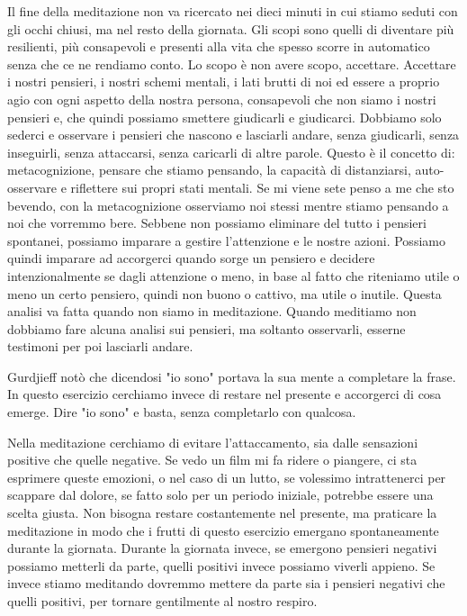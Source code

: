 \documentclass[12pt]{book} %
\begin{document}
Il fine della meditazione non va ricercato nei dieci minuti in cui stiamo seduti con gli occhi chiusi, ma nel resto della giornata. Gli scopi sono quelli di diventare più
resilienti, più consapevoli e presenti alla vita che spesso scorre in automatico senza che ce ne rendiamo conto. Lo scopo è non avere scopo, accettare. Accettare i nostri pensieri, i nostri
schemi mentali, i lati brutti di noi ed essere a proprio agio con ogni aspetto della nostra persona, consapevoli che
non siamo i nostri pensieri e, che quindi possiamo smettere giudicarli e giudicarci.
Dobbiamo solo sederci e osservare i pensieri che nascono e lasciarli andare, senza giudicarli, senza inseguirli, senza attaccarsi, senza caricarli di altre parole.
Questo è il concetto di: metacognizione, pensare che stiamo pensando, la capacità di distanziarsi, auto-osservare e riflettere sui propri
stati mentali. Se mi viene sete penso a me che sto bevendo, con la metacognizione osserviamo
noi stessi mentre stiamo pensando a noi che vorremmo bere. Sebbene non possiamo eliminare del tutto i pensieri spontanei, possiamo imparare a gestire l’attenzione e le nostre azioni. Possiamo quindi imparare ad accorgerci quando sorge un pensiero e decidere
intenzionalmente se dagli attenzione o meno, in base al fatto che riteniamo utile o meno un certo pensiero, quindi non
buono o cattivo, ma utile o inutile. Questa analisi va fatta quando non siamo in meditazione. Quando meditiamo non
dobbiamo fare alcuna analisi sui pensieri, ma soltanto osservarli, esserne testimoni per poi lasciarli andare.

Gurdjieff notò che dicendosi "io sono" portava la sua mente a completare la frase. In questo esercizio cerchiamo invece di restare nel presente e accorgerci di cosa emerge. Dire "io sono" e basta, senza completarlo con qualcosa.

Nella meditazione cerchiamo di evitare l'attaccamento, sia dalle sensazioni positive che quelle negative. Se vedo un film mi fa ridere o piangere, ci sta esprimere queste emozioni, o nel caso di un lutto, se volessimo intrattenerci per scappare dal dolore, se fatto solo per un periodo iniziale, potrebbe essere una scelta giusta.
Non bisogna restare costantemente nel presente, ma praticare la meditazione in modo che i frutti di questo esercizio emergano spontaneamente durante la giornata. Durante la giornata invece, se emergono pensieri negativi possiamo metterli da parte, quelli positivi invece possiamo viverli appieno. Se invece stiamo meditando dovremmo mettere da parte sia i pensieri negativi che quelli positivi, per tornare gentilmente al nostro respiro.
\end{document}
